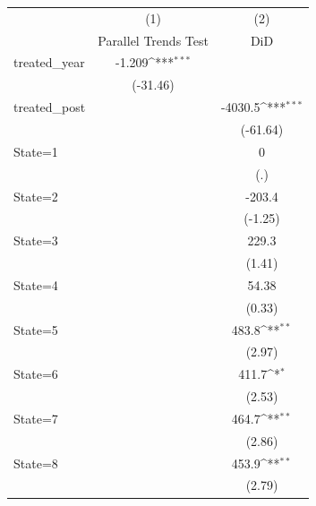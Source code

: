 \documentclass{article}
\begin{document}
{
\def\sym#1{\ifmmode^{#1}\else\(^{#1}\)\fi}
\begin{longtable}{l*{2}{c}}
\hline\hline\endfirsthead\hline\endhead\hline\endfoot\endlastfoot
                    &\multicolumn{1}{c}{(1)}&\multicolumn{1}{c}{(2)}\\
                    &\multicolumn{1}{c}{Parallel Trends Test}&\multicolumn{1}{c}{DiD}\\
\hline
treated\_year        &      -1.209\sym{***}&                     \\
                    &    (-31.46)         &                     \\
[1em]
treated\_post        &                     &     -4030.5\sym{***}\\
                    &                     &    (-61.64)         \\
[1em]
State=1             &                     &           0         \\
                    &                     &         (.)         \\
[1em]
State=2             &                     &      -203.4         \\
                    &                     &     (-1.25)         \\
[1em]
State=3             &                     &       229.3         \\
                    &                     &      (1.41)         \\
[1em]
State=4             &                     &       54.38         \\
                    &                     &      (0.33)         \\
[1em]
State=5             &                     &       483.8\sym{**} \\
                    &                     &      (2.97)         \\
[1em]
State=6             &                     &       411.7\sym{*}  \\
                    &                     &      (2.53)         \\
[1em]
State=7             &                     &       464.7\sym{**} \\
                    &                     &      (2.86)         \\
[1em]
State=8             &                     &       453.9\sym{**} \\
                    &                     &      (2.79)         \\

\end{longtable}}
\end{document}
